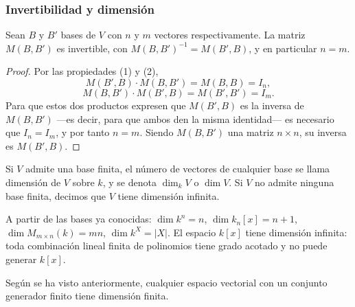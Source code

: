 \begin{frame}[allowframebreaks]
    \frametitle{Invertibilidad y dimensión}

    \begin{corollary}
        Sean $B$ y $B'$ bases de $V$ con $n$ y $m$ vectores respectivamente.
        La matriz $M(B,B')$ es invertible, con $M(B,B')^{-1}=M(B',B)$,
        y en particular $n=m$.
    \end{corollary}

    \begin{proof}
        Por las propiedades (1) y (2),
        \[
            M(B',B)\cdot M(B,B')=M(B,B)=I_n,
        \]
        \[
            M(B,B')\cdot M(B',B)=M(B',B')=I_m.
        \]
        Para que estos dos productos expresen que $M(B',B)$ es la inversa
        de $M(B,B')$ —es decir, para que ambos den la misma identidad—
        es necesario que $I_n=I_m$, y por tanto $n=m$.
        Siendo $M(B,B')$ una matriz $n\times n$, su inversa es $M(B',B)$.
    \end{proof}

    \begin{definition}
        Si $V$ admite una base finita, el número de vectores de cualquier
        base se llama \alert{dimensión} de $V$ sobre $k$, y se denota
        $\dim_k V$ o $\dim V$.
        Si $V$ no admite ninguna base finita, decimos que $V$ tiene
        \alert{dimensión infinita}.
    \end{definition}

    A partir de las bases ya conocidas: $\dim k^n=n$,
    $\dim k_n[x]=n+1$, $\dim M_{m\times n}(k)=mn$, $\dim k^X=|X|$.
    El espacio $k[x]$ tiene dimensión infinita: toda combinación lineal
    finita de polinomios tiene grado acotado y no puede generar $k[x]$.

    Según se ha visto anteriormente, cualquier espacio vectorial con un conjunto generador finito tiene dimensión finita.
\end{frame}


